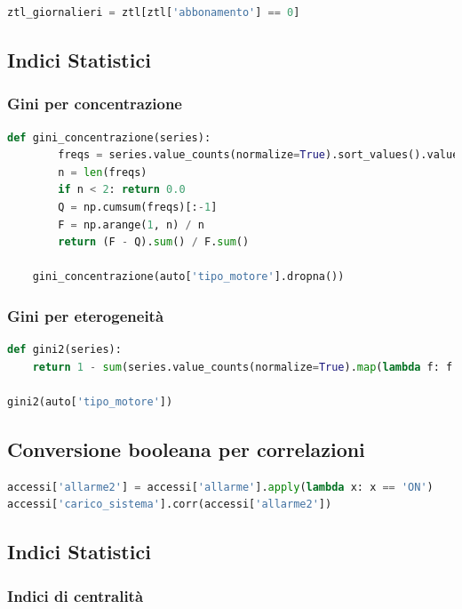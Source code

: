\documentclass{article}
\begin{document}
\begin{lstlisting}[language=Python]
    ztl_giornalieri = ztl[ztl['abbonamento'] == 0]
\end{lstlisting}

\subsection*{Indici Statistici}

\subsubsection*{Gini per concentrazione}
\begin{lstlisting}[language=Python]
    def gini_concentrazione(series):
        freqs = series.value_counts(normalize=True).sort_values().values
        n = len(freqs)
        if n < 2: return 0.0
        Q = np.cumsum(freqs)[:-1]
        F = np.arange(1, n) / n
        return (F - Q).sum() / F.sum()

    gini_concentrazione(auto['tipo_motore'].dropna())
\end{lstlisting}

\subsubsection*{Gini per eterogeneità}
\begin{lstlisting}[language=Python]
def gini2(series):
    return 1 - sum(series.value_counts(normalize=True).map(lambda f: f ** 2))

gini2(auto['tipo_motore'])
\end{lstlisting}

\subsection*{Conversione booleana per correlazioni}

\begin{lstlisting}[language=Python]
accessi['allarme2'] = accessi['allarme'].apply(lambda x: x == 'ON')
accessi['carico_sistema'].corr(accessi['allarme2'])
\end{lstlisting}

\subsection*{Indici Statistici}

\subsubsection*{Indici di centralità}
\end{document}
